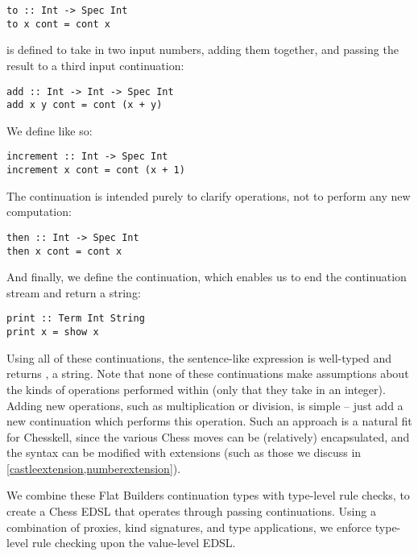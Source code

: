 \begin{lstlisting}
to :: Int -> Spec Int
to x cont = cont x
\end{lstlisting}

 is defined to take in two input numbers, adding them together, and passing the result to a third input continuation:

\begin{lstlisting}
add :: Int -> Int -> Spec Int
add x y cont = cont (x + y)
\end{lstlisting}

We define  like so:

\begin{lstlisting}
increment :: Int -> Spec Int
increment x cont = cont (x + 1)
\end{lstlisting}

The continuation  is intended purely to clarify operations, not to perform any new computation:

\begin{lstlisting}
then :: Int -> Spec Int
then x cont = cont x
\end{lstlisting}

And finally, we define the  continuation, which enables us to end the continuation stream and return a string:

\begin{lstlisting}
print :: Term Int String
print x = show x
\end{lstlisting}

Using all of these continuations, the sentence-like expression  is well-typed and returns , a string. Note that none of these continuations make assumptions about the kinds of operations performed within (only that they take in an integer). Adding new operations, such as multiplication or division, is simple -- just add a new continuation which performs this operation. Such an approach is a natural fit for Chesskell, since the various Chess moves can be (relatively) encapsulated, and the syntax can be modified with extensions (such as those we discuss in \cref{castleextension,numberextension}).

We combine these Flat Builders continuation types with type-level rule checks, to create a Chess EDSL that operates through passing continuations. Using a combination of proxies, kind signatures, and type applications, we enforce type-level rule checking upon the value-level EDSL.

